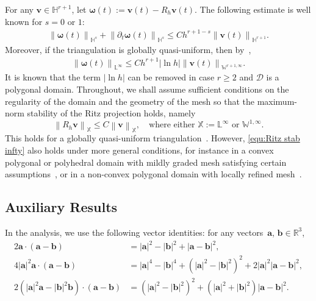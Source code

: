 \documentclass[11pt, reqno]{amsart}
\theoremstyle{definition}
\theoremstyle{remark}
\numberwithin{equation}{section}
\newcommand{\bff}{\boldsymbol}
\newcommand{\bb}{\mathbb}
\newcommand{\norm}[2]{\left\|{#1}\right\|_{#2}}
\newcommand{\abs}[1]{\left|{#1}\right|}
\begin{document}
For any $\bff{v}\in \bb{H}^{r+1}$, let $\bff{\omega}(t):= \bff{v}(t)-R_h\bff{v}(t)$. The following estimate is well known \cite{Tho06} for $s=0$ or $1$:
\begin{align}\label{equ:Ritz ineq}
	\norm{\bff{\omega}(t)}{\bb{H}^s} + \norm{\partial_t \bff{\omega}(t)}{\bb{H}^s}
	\leq
	C h^{r+1-s} \norm{\bff{v}(t)}{\bb{H}^{r+1}}.
\end{align}
Moreover, if the triangulation is globally quasi-uniform, then by~\cite{Sco76},
\begin{align}\label{equ:Ritz ineq L infty}
	\norm{\bff{\omega}(t)}{\bb{L}^\infty} \leq Ch^{r+1} \abs{\ln h} \norm{\bff{v}(t)}{\bb{W}^{r+1,\infty}}.
\end{align}
It is known that the term $\abs{\ln h}$ can be removed in case $r\geq 2$ and $\mathscr{D}$ is a polygonal domain.
Throughout, we shall assume sufficient conditions on the regularity of the domain and the geometry of the mesh so that the maximum-norm stability of the Ritz projection holds, namely
\begin{equation}\label{equ:Ritz stab infty}
	\norm{R_h \bff{v}}{\bb{X}}
	\leq 
	C \norm{\bff{v}}{\bb{X}},
	\quad \text{where either } \bb{X}:= \bb{L}^\infty \text{ or } \bb{W}^{1,\infty}.
\end{equation}
This holds for a globally quasi-uniform triangulation~\cite{DemLeySchWah12}. However, \eqref{equ:Ritz stab infty} also holds under more general conditions, for instance in a convex polygonal or polyhedral domain with mildly graded mesh satisfying certain assumptions~\cite{DemLeySchWah12, Li17}, or in a non-convex polygonal domain with locally refined mesh~\cite{Li22}.



\subsection{Auxiliary Results}\label{sec:basic results}

In the analysis, we use the following vector identities: for any vectors~$\bff{a}$, $\bff{b}\in \bb{R}^3$,
\begin{align}\label{equ:a dot ab}
	2\bff{a}\cdot (\bff{a}-\bff{b}) 
	&= 
	\abs{\bff{a}}^2 - \abs{\bff{b}}^2 + \abs{\bff{a}-\bff{b}}^2,
	\\
	\label{equ:a2a dot ab}
	4\abs{\bff{a}}^2 \bff{a} \cdot (\bff{a}-\bff{b})
	&=
	\abs{\bff{a}}^4 - \abs{\bff{b}}^4 + \left(\abs{\bff{a}}^2 - \abs{\bff{b}}^2\right)^2 
	+ 2 \abs{\bff{a}}^2 \abs{\bff{a}-\bff{b}}^2,
	\\
	\label{equ:a2a b2b dot ab}
	2(\abs{\bff{a}}^2 \bff{a} - \abs{\bff{b}}^2 \bff{b}) \cdot (\bff{a}-\bff{b})
	&=
	\left(\abs{\bff{a}}^2 - \abs{\bff{b}}^2 \right)^2 + \left(\abs{\bff{a}}^2+\abs{\bff{b}}^2\right) \abs{\bff{a}-\bff{b}}^2.
\end{align}
\end{document}
